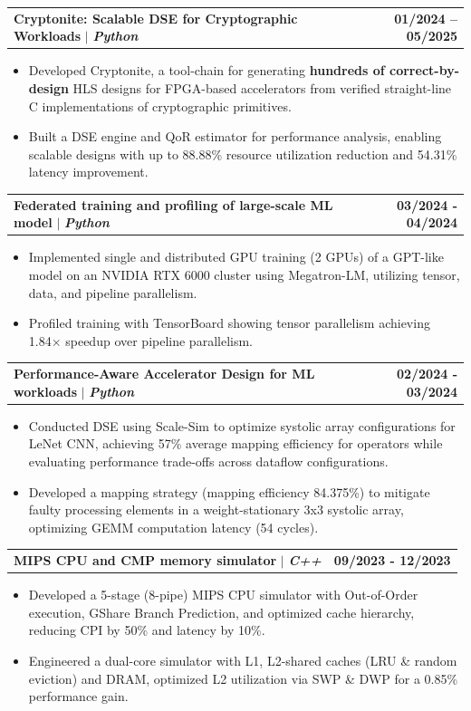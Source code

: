\documentclass[a4paper,11pt]{article}
\makeatletter
\newcommand{\resumeItem}[1]{
  \item\small{
    {#1 \vspace{-2pt}}
  }
}
\newcommand{\resumeProjectHeading}[2]{
    \item
    \begin{tabular*}{1.001\textwidth}{l@{\extracolsep{\fill}}r}
      \small#1 & \textbf{\small #2}\\
    \end{tabular*}\vspace{-7pt}
}
\newcommand{\resumeSubItem}[1]{\resumeItem{#1}\vspace{-4pt}}
\newcommand{\resumeItemListStart}{\begin{itemize}}
\newcommand{\resumeItemListEnd}{\end{itemize}\vspace{-5pt}}
\makeatother
\begin{document}
      \resumeProjectHeading {\textbf{Cryptonite: Scalable DSE for Cryptographic Workloads} $|$ \textit{\textbf{Python}}}{01/2024 -- 05/2025}
      \resumeItemListStart
            \resumeItem{Developed Cryptonite, a tool-chain for generating \textbf{hundreds of correct-by-design} HLS designs for FPGA-based accelerators from verified straight-line C implementations of cryptographic primitives.}
            \resumeSubItem{Built a DSE engine and QoR estimator for performance analysis, enabling scalable designs with up to 88.88\% resource utilization reduction and 54.31\% latency improvement.}
      \resumeItemListEnd

      \resumeProjectHeading {\textbf{Federated training and profiling of large-scale ML model} $|$ \textit{\textbf{Python}}}{03/2024 - 04/2024}
        \resumeItemListStart
            \resumeItem{Implemented single and distributed GPU training (2 GPUs) of a GPT-like model on an NVIDIA RTX 6000 cluster using Megatron-LM, utilizing tensor, data, and pipeline parallelism.} 
            \resumeItem{Profiled training with TensorBoard showing tensor parallelism achieving 1.84× speedup over pipeline parallelism.}
        \resumeItemListEnd
        \vspace{-15pt}
        
        \resumeProjectHeading {\textbf{Performance-Aware Accelerator Design for ML workloads} $|$ \textit{\textbf{Python}}}{02/2024 - 03/2024}
        \resumeItemListStart
            \resumeItem{Conducted DSE using Scale-Sim to optimize systolic array configurations for LeNet CNN, achieving 57\% average mapping efficiency for operators while evaluating performance trade-offs across dataflow configurations.}
            \resumeItem{Developed a mapping strategy (mapping efficiency 84.375\%) to mitigate faulty processing elements in a weight-stationary 3x3 systolic array, optimizing GEMM computation latency (54 cycles).}
        \resumeItemListEnd
        \vspace{-15pt}

        \resumeProjectHeading {\textbf{MIPS CPU and CMP memory simulator} $|$ \textit{\textbf{C++}}}{09/2023 - 12/2023}
        \resumeItemListStart
            \resumeItem{Developed a 5-stage (8-pipe) MIPS CPU simulator with Out-of-Order execution, GShare Branch Prediction, and optimized cache hierarchy, reducing CPI by 50\% and latency by 10\%.}
            \resumeItem{Engineered a dual-core simulator with L1, L2-shared caches (LRU \& random eviction) and DRAM, optimized L2 utilization via SWP \& DWP for a 0.85\% performance gain.}
        \resumeItemListEnd 
        
\end{document}
